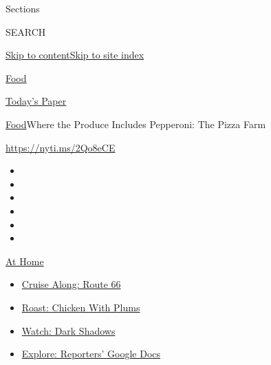Sections

SEARCH

\protect\hyperlink{site-content}{Skip to
content}\protect\hyperlink{site-index}{Skip to site index}

\href{https://www.nytimes3xbfgragh.onion/section/food}{Food}

\href{https://myaccount.nytimes3xbfgragh.onion/auth/login?response_type=cookie\&client_id=vi}{}

\href{https://www.nytimes3xbfgragh.onion/section/todayspaper}{Today's
Paper}

\href{/section/food}{Food}\textbar{}Where the Produce Includes
Pepperoni: The Pizza Farm

\url{https://nyti.ms/2Qo8eCE}

\begin{itemize}
\item
\item
\item
\item
\item
\item
\end{itemize}

\href{https://www.nytimes3xbfgragh.onion/spotlight/at-home?action=click\&pgtype=Article\&state=default\&region=TOP_BANNER\&context=at_home_menu}{At
Home}

\begin{itemize}
\tightlist
\item
  \href{https://www.nytimes3xbfgragh.onion/2020/09/07/travel/route-66.html?action=click\&pgtype=Article\&state=default\&region=TOP_BANNER\&context=at_home_menu}{Cruise
  Along: Route 66}
\item
  \href{https://www.nytimes3xbfgragh.onion/2020/09/04/dining/sheet-pan-chicken.html?action=click\&pgtype=Article\&state=default\&region=TOP_BANNER\&context=at_home_menu}{Roast:
  Chicken With Plums}
\item
  \href{https://www.nytimes3xbfgragh.onion/2020/09/04/arts/television/dark-shadows-stream.html?action=click\&pgtype=Article\&state=default\&region=TOP_BANNER\&context=at_home_menu}{Watch:
  Dark Shadows}
\item
  \href{https://www.nytimes3xbfgragh.onion/interactive/2020/at-home/even-more-reporters-editors-diaries-lists-recommendations.html?action=click\&pgtype=Article\&state=default\&region=TOP_BANNER\&context=at_home_menu}{Explore:
  Reporters' Google Docs}
\end{itemize}

